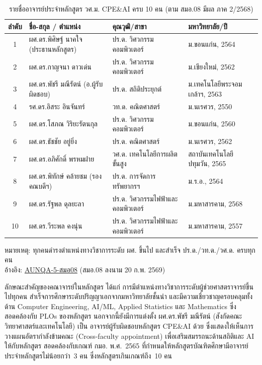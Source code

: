 \begin{table}[H]
  \centering
  \caption{รายชื่ออาจารย์ประจำหลักสูตร วศ.ม. CPE\&AI ครบ 10 คน (ตาม สมอ.08 มีผล ภาค 2/2568)}
  \label{tbl:staff_list_full}
  \begingroup
  \footnotesize
  \setlength{\tabcolsep}{3pt}
  \renewcommand{\arraystretch}{1.2}
  \begin{tabularx}{\linewidth}{|c|>{\raggedright\arraybackslash}X|>{\raggedright\arraybackslash}X|l|}
    \hline
    \textbf{ลำดับ} & \textbf{ชื่อ-สกุล / ตำแหน่ง} & \textbf{คุณวุฒิ/สาขา} & \textbf{มหาวิทยาลัย/ปี} \\
    \hline
    1 & ผศ.ดร.พิศิษฐ์ นาคใจ (ประธานหลักสูตร) & ปร.ด. วิศวกรรมคอมพิวเตอร์ & ม.ขอนแก่น, 2564 \\
    \hline
    2 & ผศ.ดร.กาญจนา ดาวเด่น & ปร.ด. วิศวกรรมคอมพิวเตอร์ & ม.เชียงใหม่, 2562 \\
    \hline
    3 & ผศ.ดร.พัชรี มณีรัตน์ (อ.ผู้รับผิดชอบ) & ปร.ด. สถิติประยุกต์ & ม.เทคโนโลยีพระจอมเกล้าฯ, 2563 \\
    \hline
    4 & รศ.ดร.อิสระ อินจันทร์ & วท.ด. คณิตศาสตร์ & ม.นเรศวร, 2550 \\
    \hline
    5 & ผศ.ดร.โสภณ วิริยะรัตนกุล & ปร.ด. วิศวกรรมคอมพิวเตอร์ & ม.ขอนแก่น, 2560 \\
    \hline
    6 & ผศ.ดร.ธัชชัย อยู่ยิ่ง & ปร.ด. คณิตศาสตร์ & ม.นเรศวร, 2562 \\
    \hline
    7 & ผศ.ดร.อภิศักดิ์ พรหมฝาย & วศ.ด. เทคโนโลยีการผลิตขั้นสูง & สถาบันเทคโนโลยีปทุมวัน, 2565 \\
    \hline
    8 & ผศ.ดร.พิทักษ์ คล้ายชม (รองคณบดีฯ) & ปร.ด. การจัดการทรัพยากรฯ & ม.ร.อ., 2564 \\
    \hline
    9 & ผศ.ดร.รัฐพล ดุลยะลา & ปร.ด. วิศวกรรมไฟฟ้าและคอมพิวเตอร์ & ม.มหาสารคาม, 2568 \\
    \hline
    10 & ผศ.ดร.วีระพล คงนุ่น & ปร.ด. วิศวกรรมไฟฟ้าและคอมพิวเตอร์ & ม.มหาสารคาม, 2557 \\
    \hline
  \end{tabularx}
  \endgroup
  \begin{flushleft}
    \footnotesize หมายเหตุ: ทุกคนดำรงตำแหน่งทางวิชาการระดับ ผศ. ขึ้นไป และสำเร็จ ปร.ด./วท.ด./วศ.ด. ครบทุกคน \\
    อ้างอิง: \hyperlink{ref:AUNQA-5-สมอ08}{AUNQA-5-สมอ08} (สมอ.08 ลงนาม 20 ก.พ. 2569)
  \end{flushleft}
\end{table}

ลักษณะสำคัญของคณาจารย์ในหลักสูตร ได้แก่ การมีตำแหน่งทางวิชาการระดับผู้ช่วยศาสตราจารย์ขึ้นไปทุกคน สำเร็จการศึกษาระดับปริญญาเอกจากมหาวิทยาลัยชั้นนำ และมีความเชี่ยวชาญครอบคลุมทั้งด้าน Computer Engineering, AI/ML, Applied Statistics และ Mathematics ซึ่งสอดคล้องกับ PLOs ของหลักสูตร นอกจากนี้ยังมีการแต่งตั้ง ผศ.ดร.พัชรี มณีรัตน์ (สังกัดคณะวิทยาศาสตร์และเทคโนโลยี) เป็น อาจารย์ผู้รับผิดชอบหลักสูตร CPE\&AI ด้วย ซึ่งแสดงให้เห็นการวางแผนอัตรากำลังข้ามคณะ (Cross-faculty appointment) เพื่อเสริมสมรรถนะด้านสถิติและ AI ให้กับหลักสูตร สอดคล้องกับเกณฑ์ กมอ. พ.ศ.~2565 ที่กำหนดให้หลักสูตรบัณฑิตศึกษามีอาจารย์ประจำหลักสูตรไม่น้อยกว่า~3 คน ซึ่งหลักสูตรเกินเกณฑ์ถึง~10 คน

